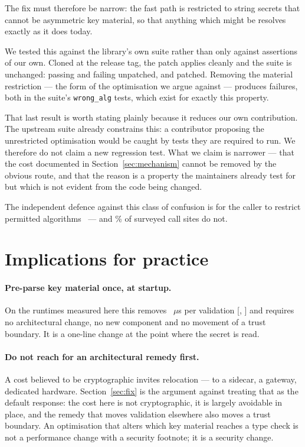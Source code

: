 \documentclass[pdflatex,sn-basic,twocolumn]{sn-jnl}
\begin{document}
The fix must therefore be narrow: the fast path is restricted to string secrets
that cannot be asymmetric key material, so that anything which might be resolves
exactly as it does today.

We tested this against the library's own suite rather than only against
assertions of our own. Cloned at the release tag, the patch applies cleanly and
the suite is unchanged: \SuiteStockPassing{} passing and \SuiteStockFailing{}
failing unpatched, \SuitePatchedPassing{} and \SuitePatchedFailing{} patched.
Removing the material restriction --- the form of the optimisation we argue
against --- produces \SuiteNaiveFailing{} failures, both in the suite's
\texttt{wrong\_alg} tests, which exist for exactly this property.

That last result is worth stating plainly because it reduces our own
contribution. The upstream suite already constrains this: a contributor
proposing the unrestricted optimisation would be caught by tests they are
required to run. We therefore do not claim a new regression test. What we claim
is narrower --- that the cost documented in Section~\ref{sec:mechanism} cannot be
removed by the obvious route, and that the reason is a property the maintainers
already test for but which is not evident from the code being changed.

The independent defence against this class of confusion is for the caller to
restrict permitted algorithms~\cite{rfc8725} --- and \SampleNoAlgorithmsPct\% of
surveyed call sites do not.

\section{Implications for practice}\label{sec:implications}

\paragraph{Pre-parse key material once, at startup.} On the runtimes measured
here this removes \HostStringPenalty~$\mu$s per validation
[\HostStringPenaltyCiLo, \HostStringPenaltyCiHi] and requires no architectural
change, no new component and no movement of a trust boundary. It is a one-line
change at the point where the secret is read.

\paragraph{Do not reach for an architectural remedy first.} A cost believed to be
cryptographic invites relocation --- to a sidecar, a gateway, dedicated hardware.
Section~\ref{sec:fix} is the argument against treating that as the default
response: the cost here is not cryptographic, it is largely avoidable in place,
and the remedy that moves validation elsewhere also moves a trust boundary. An
optimisation that alters which key material reaches a type check is not a
performance change with a security footnote; it is a security change.
\end{document}

